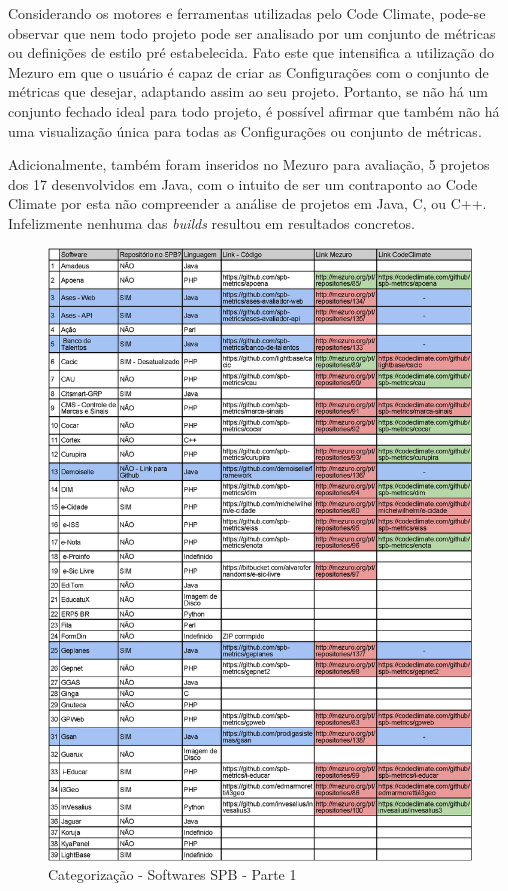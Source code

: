 Considerando os motores e ferramentas utilizadas pelo Code Climate, pode-se
observar que nem todo projeto pode ser analisado por um conjunto de métricas ou
definições de estilo pré estabelecida. Fato este que intensifica a utilização do
Mezuro em que o usuário é capaz de criar as Configurações com o conjunto de
métricas que desejar, adaptando assim ao seu projeto. Portanto, se não há um
conjunto fechado ideal para todo projeto, é possível afirmar que também não há
uma visualização única para todas as Configurações ou conjunto de métricas.

Adicionalmente, também foram inseridos no Mezuro para avaliação, 5 projetos dos
17 desenvolvidos em Java, com o intuito de ser um contraponto ao Code Climate
por esta não compreender a análise de projetos em Java, C, ou C++. Infelizmente
nenhuma das \textit{builds} resultou em resultados concretos.

\newpage


\begin{figure}[!htb]
	\centering
    \includegraphics[keepaspectratio=true,scale=0.85]
    {tabelas/spb_1_v2-crop.eps}
  \caption{Categorização - Softwares SPB - Parte 1}
  \label{fig:softwares_spb_1}
\end{figure}

